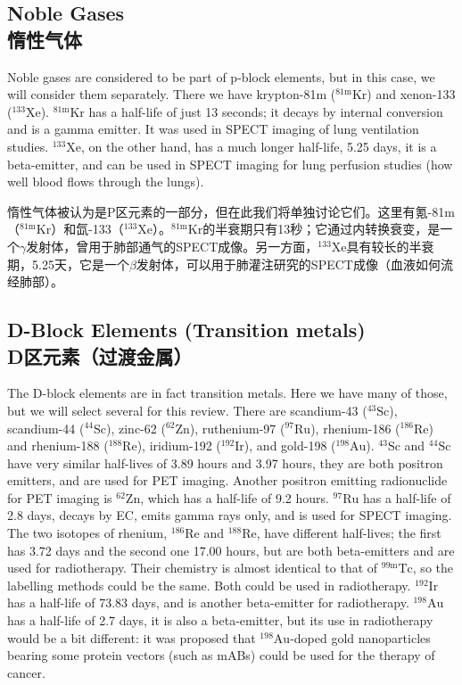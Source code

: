 \documentclass[dvipsnames, svgnames,a4paper,11pt]{article}
\begin{document}
\subsection{Noble Gases \\惰性气体}

Noble gases are considered to be part of p-block elements, but in this case, we will consider them separately. There we have krypton-81m (\(\mathrm{^{81m}Kr}\)) and xenon-133 (\(\mathrm{^{133}Xe}\)). \(\mathrm{^{81m}Kr}\) has a half-life of just 13 seconds; it decays by internal conversion and is a gamma emitter. It was used in SPECT imaging of lung ventilation studies. \(\mathrm{^{133}Xe}\), on the other hand, has a much longer half-life, 5.25 days, it is a beta-emitter, and can be used in SPECT imaging for lung perfusion studies (how well blood flows through the lungs).

惰性气体被认为是P区元素的一部分，但在此我们将单独讨论它们。这里有氪-81m（\(\mathrm{^{81m}Kr}\)）和氙-133（\(\mathrm{^{133}Xe}\)）。\(\mathrm{^{81m}Kr}\)的半衰期只有13秒；它通过内转换衰变，是一个$\gamma$发射体，曾用于肺部通气的SPECT成像。另一方面，\(\mathrm{^{133}Xe}\)具有较长的半衰期，5.25天，它是一个$\beta$发射体，可以用于肺灌注研究的SPECT成像（血液如何流经肺部）。

\subsection{D-Block Elements (Transition metals) \\D区元素（过渡金属）}  

The D-block elements are in fact transition metals. Here we have many of those, but we will select several for this review. There are scandium-43 (\(\mathrm{^{43}Sc}\)), scandium-44 (\(\mathrm{^{44}Sc}\)), zinc-62 (\(\mathrm{^{62}Zn}\)), ruthenium-97 (\(\mathrm{^{97}Ru}\)), rhenium-186 (\(\mathrm{^{186}Re}\)) and rhenium-188 (\(\mathrm{^{188}Re}\)), iridium-192 (\(\mathrm{^{192}Ir}\)), and gold-198 (\(\mathrm{^{198}Au}\)). \(\mathrm{^{43}Sc}\) and \(\mathrm{^{44}Sc}\) have very similar half-lives of 3.89 hours and 3.97 hours, they are both positron emitters, and are used for PET imaging. Another positron emitting radionuclide for PET imaging is \(\mathrm{^{62}Zn}\), which has a half-life of 9.2 hours. \(\mathrm{^{97}Ru}\) has a half-life of 2.8 days, decays by EC, emits gamma rays only, and is used for SPECT imaging. The two isotopes of rhenium, \(\mathrm{^{186}Re}\) and \(\mathrm{^{188}Re}\), have different half-lives; the first has 3.72 days and the second one 17.00 hours, but are both beta-emitters and are used for radiotherapy. Their chemistry is almost identical to that of \(\mathrm{^{99m}Tc}\), so the labelling methods could be the same. Both could be used in radiotherapy. \(\mathrm{^{192}Ir}\) has a half-life of 73.83 days, and is another beta-emitter for radiotherapy. \(\mathrm{^{198}Au}\) has a half-life of 2.7 days, it is also a beta-emitter, but its use in radiotherapy would be a bit different: it was proposed that \(\mathrm{^{198}Au}\)-doped gold nanoparticles bearing some protein vectors (such as mABs) could be used for the therapy of cancer.  
\end{document}
